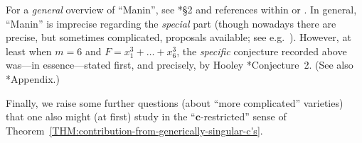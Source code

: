 \documentclass[12pt]{report}
\begin{document}

For a \emph{general} overview of ``Manin'',
see \cite{bombieri2009problems}*{\S2 and references within} or \cites{browning2009quantitative,jahnel2014brauer}.
In general,
``Manin'' is imprecise regarding the \emph{special} part (though nowadays there are precise, but sometimes complicated, proposals available; see e.g.~\cite{lehmann2018geometric}).
However,
at least when $m=6$ and $F=x_1^3+\dots+x_6^3$,
the \emph{specific} conjecture recorded above was---in essence---stated
first, and precisely, by Hooley \cite{hooley1986some}*{Conjecture~2}.
(See also \cite{vaughan1995certain}*{Appendix}.)

Finally, we raise some further questions (about ``more complicated'' varieties)
that one also might (at first) study in the ``$\bm{c}$-restricted'' sense of Theorem~\ref{THM:contribution-from-generically-singular-c's}.

\end{document}
